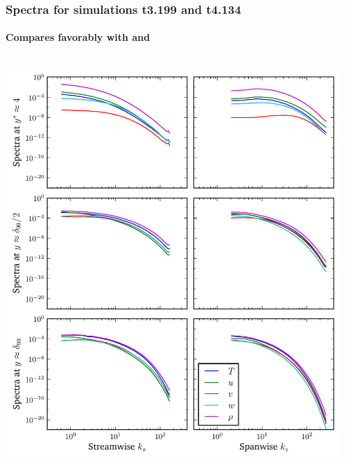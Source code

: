 \documentclass[mathserif]{beamer}
\begin{document}
\begin{frame}
    \frametitle{Spectra for simulations t3.199 and t4.134}
    \framesubtitle{Compares favorably with \citet{Coleman1995Numerical} and \citet{Guarini2000Direct}}
    \begin{columns}
        \begin{column}{0.5\linewidth}
          \includegraphics[width=\textwidth]{spectra-turb3199}
        \end{column}
        \begin{column}{0.5\linewidth}

\end{column}
\end{columns}
\end{frame}
\end{document}
